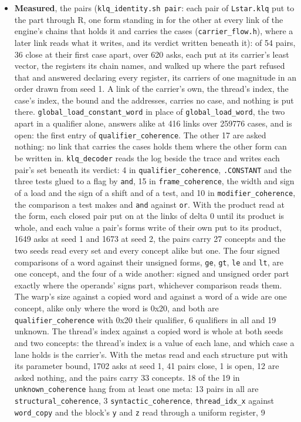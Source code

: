 \begin{itemize}
\item \textbf{Measured}, the pairs (\texttt{klq\_\allowbreak{}identity.\allowbreak{}sh pair}: each pair of \texttt{Lstar.\allowbreak{}klq} put to the part through R, one form standing in for the other at every link of the engine's chains that holds it and carries the cases (\texttt{carrier\_\allowbreak{}flow.\allowbreak{}h}), where a later link reads what it writes, and its verdict written beneath it): of 54 pairs, 36 close at their first case apart, over 620 asks, each put at its carrier's least vector, the registers its chain names, and walked up where the part refused that and answered declaring every register, its carriers of one magnitude in an order drawn from seed 1. A link of the carrier's own, the thread's index, the case's index, the bound and the addresses, carries no case, and nothing is put there. \texttt{global\_\allowbreak{}load\_\allowbreak{}constant\_\allowbreak{}word} in place of \texttt{global\_\allowbreak{}load\_\allowbreak{}word}, the two apart in a qualifier alone, answers alike at 416 links over 259776 cases, and is open: the first entry of \texttt{qualifier\_\allowbreak{}coherence}. The other 17 are asked nothing: no link that carries the cases holds them where the other form can be written in. \texttt{klq\_\allowbreak{}decoder} reads the log beside the trace and writes each pair's set beneath its verdict: 4 in \texttt{qualifier\_\allowbreak{}coherence}, \texttt{.\allowbreak{}CONSTANT} and the three tests glued to a flag by \texttt{and}, 15 in \texttt{frame\_\allowbreak{}coherence}, the width and sign of a load and the sign of a shift and of a test, and 10 in \texttt{modifier\_\allowbreak{}coherence}, the comparison a test makes and \texttt{and} against \texttt{or}. With the product read at the form, each closed pair put on at the links of delta 0 until its product is whole, and each value a pair's forms write of their own put to its product, 1649 asks at seed 1 and 1673 at seed 2, the pairs carry 27 concepts and the two seeds read every set and every concept alike but one. The four signed comparisons of a word against their unsigned forms, \texttt{ge}, \texttt{gt}, \texttt{le} and \texttt{lt}, are one concept, and the four of a wide another: signed and unsigned order part exactly where the operands' signs part, whichever comparison reads them. The warp's size against a copied word and against a word of a wide are one concept, alike only where the word is 0x20, and both are \texttt{qualifier\_\allowbreak{}coherence} with 0x20 their qualifier, 6 qualifiers in all and 19 unknown. The thread's index against a copied word is whole at both seeds and two concepts: the thread's index is a value of each lane, and which case a lane holds is the carrier's. With the metas read and each structure put with its parameter bound, 1702 asks at seed 1, 41 pairs close, 1 is open, 12 are asked nothing, and the pairs carry 33 concepts. 18 of the 19 in \texttt{unknown\_\allowbreak{}coherence} hang from at least one meta: 13 pairs in all are \texttt{structural\_\allowbreak{}coherence}, 3 \texttt{syntactic\_\allowbreak{}coherence}, \texttt{thread\_\allowbreak{}idx\_\allowbreak{}x} against \texttt{word\_\allowbreak{}copy} and the block's \texttt{y} and \texttt{z} read through a uniform register, 9 
\end{itemize}
